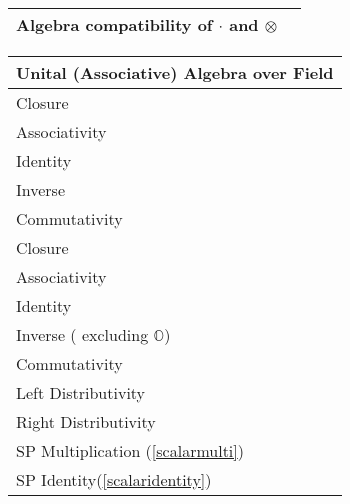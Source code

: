 \documentclass[a4paper,12pt]{scrartcl}    %
\newcommand{\OpA}{\otimes}
\begin{document}
\begin{landscape}
\begin{minipage}[c]{0.32\textwidth}
\begin{tabular}{|l|c|}
			    \hline	   
			    \cellcolor{green!25} \footnotesize Algebra compatibility of $\cdot$ and $\OpA$ & \tiny\cellcolor{yellow!25} \\					   \hline
			\end{tabular}	
		\end{minipage}
				\hspace{8em}
		\begin{minipage}[c]{0.32\textwidth}	
			\begin{tabular}{|l|c|} %
			  \hline
			  \multicolumn{2}{|c|}{\cellcolor{blue!25} Unital (Associative) Algebra over Field} \\
			  \hline
			    \cellcolor{green!25} \footnotesize Closure& \cellcolor{yellow!25}  \\
			    \cellcolor{green!25} \footnotesize Associativity& \cellcolor{yellow!25}  \\
			    \cellcolor{green!25} \footnotesize Identity& \cellcolor{yellow!25} \\
			    \cellcolor{green!25} \footnotesize Inverse& \cellcolor{yellow!25} \\
			    \cellcolor{green!25} \footnotesize Commutativity & \cellcolor{yellow!25} \\
			    \cellcolor{green!25} \footnotesize Closure& \cellcolor{yellow!25}  \\
			    \cellcolor{green!25} \footnotesize Associativity& \cellcolor{yellow!25}  \\
			    \cellcolor{green!25} \footnotesize Identity& \cellcolor{yellow!25} \\
			    \cellcolor{orange!25} \footnotesize Inverse \tiny( excluding $\mathbb{O}$)& \cellcolor{yellow!25} \\
			    \cellcolor{green!25} \footnotesize Commutativity& \cellcolor{yellow!25} \\
			  	\cellcolor{green!25} \footnotesize Left Distributivity&  \cellcolor{yellow!25} \\
			    \cellcolor{green!25} \footnotesize Right Distributivity & \tiny\cellcolor{yellow!25} \multirow{-12}{*}{\tiny \rotatebox[origin=c]{90}{Field $(\KField,+,\cdot,1)$}}  \\
			   \hline
			  \hline
			     \cellcolor{green!25} \footnotesize SP Multiplication (\ref{scalarmulti})&  \tiny\cellcolor{yellow!25} \\
			    \cellcolor{green!25} \footnotesize SP Identity(\ref{scalaridentity}) & \tiny\cellcolor{yellow!25}  \\

\end{tabular}
\end{minipage}
\end{landscape}
\end{document}
